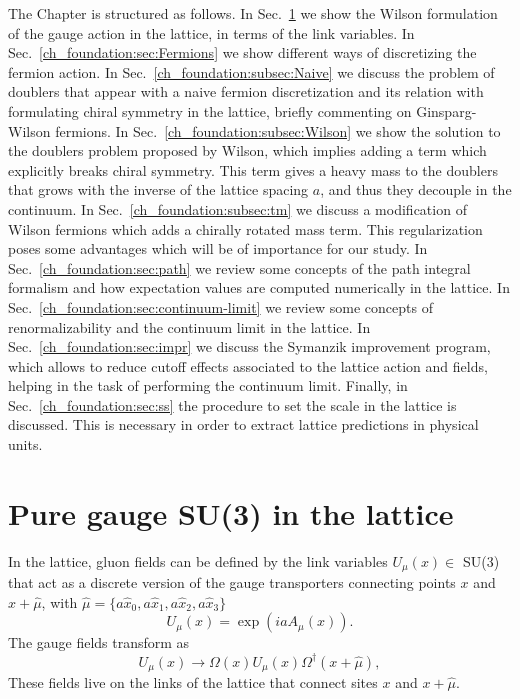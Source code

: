 The Chapter is structured as follows. In Sec.~\ref{ch_foundation:sec:Gauge} we show the Wilson formulation of the gauge action in the lattice, in terms of the link variables. In Sec.~\ref{ch_foundation:sec:Fermions} we show different ways of discretizing the fermion action. In Sec.~\ref{ch_foundation:subsec:Naive} we discuss the problem of doublers that appear with a naive fermion discretization and its relation with formulating chiral symmetry in the lattice, briefly commenting on Ginsparg-Wilson fermions. In Sec.~\ref{ch_foundation:subsec:Wilson} we show the solution to the doublers problem proposed by Wilson, which implies adding a term which explicitly breaks chiral symmetry. This term gives a heavy mass to the doublers that grows with the inverse of the lattice spacing $a$, and thus they decouple in the continuum. In Sec.~\ref{ch_foundation:subsec:tm} we discuss a modification of Wilson fermions which adds a chirally rotated mass term. This regularization poses some advantages which will be of importance for our study. In Sec.~\ref{ch_foundation:sec:path} we review some concepts of the path integral formalism and how expectation values are computed numerically in the lattice. In Sec.~\ref{ch_foundation:sec:continuum-limit} we review some concepts of renormalizability and the continuum limit in the lattice. In Sec.~\ref{ch_foundation:sec:impr} we discuss the Symanzik improvement program, which allows to reduce cutoff effects associated to the lattice action and fields, helping in the task of performing the continuum limit. Finally, in Sec.~\ref{ch_foundation:sec:ss} the procedure to set the scale in the lattice is discussed. This is necessary in order to extract lattice predictions in physical units.


\section{Pure gauge SU(3) in the lattice}
\label{ch_foundation:sec:Gauge}

In the lattice, gluon fields can be defined by the link variables $U_{\mu}(x)\in$ SU(3) that act as a discrete version of the gauge transporters connecting points $x$ and $x+\hat{\mu}$, with $\hat{\mu}=\{a\hat{x}_0,a\hat{x}_1,a\hat{x}_2,a\hat{x}_3\}$
\begin{equation}
\label{ch_foundation:eq:U}
U_{\mu}(x)=\exp\left(iaA_{\mu}(x)\right).
\end{equation}
The gauge fields transform as 
\begin{equation}
\label{ch_foundation:eq:U_transf}
U_{\mu}(x)\to\Omega(x)U_{\mu}(x)\Omega^{\dagger}(x+\hat{\mu}),
\end{equation}
These fields live on the links of the lattice that connect sites $x$ and $x+\hat{\mu}$.

